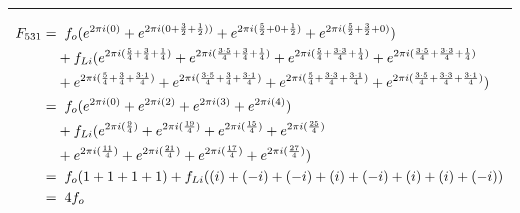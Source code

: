 \documentclass{article}
\begin{document}
\noindent\rule{12cm}{0.4pt}
\begin{align*}
	F_{531} =& \hspace{0.2cm}  f_{o}  (e^{2 \pi i (0)} 
	+ e^{2 \pi i (0 + \frac{3}{2} + \frac{1}{2}))} 
	+ e^{2 \pi i (\frac{5}{2} + 0 + \frac{1}{2})} 
	+ e^{2 \pi i (\frac{5}{2} + \frac{3}{2} + 0)})  \\
	&+ f_{Li} (e^{2 \pi i (\frac{5}{4} + \frac{3}{4} + \frac{1}{4})}  
	+ e^{2 \pi i (\frac{3 \cdot 5}{4} + \frac{3}{4} + \frac{1}{4})} 
	+ e^{2 \pi i (\frac{5}{4} + \frac{3 \cdot 3}{4} + \frac{1}{4})} 
	+ e^{2 \pi i (\frac{3 \cdot 5}{4} + \frac{3 \cdot 3}{4} + \frac{1}{4})} \\
	&+ e^{2 \pi i (\frac{5}{4} + \frac{3}{4} + \frac{3 \cdot 1}{4})}
	+ e^{2 \pi i (\frac{3 \cdot 5}{4} + \frac{3}{4} + \frac{3 \cdot 1}{4})} 
	+ e^{2 \pi i (\frac{5}{4} + \frac{3 \cdot 3}{4} + \frac{3 \cdot 1}{4})} 
	+ e^{2 \pi i (\frac{3 \cdot 5}{4} + \frac{3 \cdot 3}{4} + \frac{3 \cdot 1}{4})}) \\  
	=& \hspace{0.2cm}  f_{o}  (e^{2 \pi i (0)} 
	+ e^{2 \pi i (2)} 
	+ e^{2 \pi i (3)} 
	+ e^{2 \pi i (4)})  \\
	&+ f_{Li} (e^{2 \pi i (\frac{9}{4})}  
	+ e^{2 \pi i (\frac{19}{4})} 
	+ e^{2 \pi i (\frac{15}{4})} 
	+ e^{2 \pi i (\frac{25}{4})} \\
	&+ e^{2 \pi i (\frac{11}{4})}
	+ e^{2 \pi i (\frac{21}{4})} 
	+ e^{2 \pi i (\frac{17}{4})} 
	+ e^{2 \pi i (\frac{27}{4})}) \\
	=& \hspace{0.2cm}  f_{o}  (1  + 1 + 1 + 1) + f_{Li}((i) + (-i) + (-i) + (i) + (-i) + (i) + (i) + (-i)) \\
	=& \hspace{0.2cm} 4f_{o} 
\end{align*}
\end{document}
